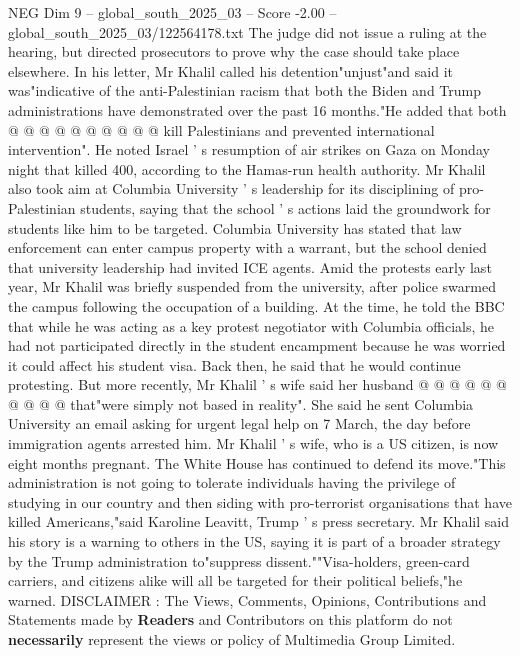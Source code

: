 \begin{textsample}{NEG Dim 9 – global\_south\_2025\_03 – Score -2.00 – global\_south\_2025\_03/122564178.txt}
The judge did not issue a ruling at the hearing, but directed prosecutors to prove why the case should take place elsewhere.
In his letter, Mr Khalil called his detention"unjust"and said it was"indicative of the anti-Palestinian racism that both the Biden and Trump administrations have demonstrated over the past 16 months."He added that both @ @ @ @ @ @ @ @ @ @ kill Palestinians and prevented international intervention".
He noted Israel ' s resumption of air strikes on Gaza on Monday night that killed 400, according to the Hamas-run health authority.
Mr Khalil also took aim at Columbia University ' s leadership for its disciplining of pro-Palestinian students, saying that the school ' s actions laid the groundwork for students like him to be targeted.
Columbia University has stated that law enforcement can enter campus property with a warrant, but the school denied that university leadership had invited ICE agents.
Amid the protests early last year, Mr Khalil was briefly suspended from the university, after police swarmed the campus following the occupation of a building.
At the time, he told the BBC that while he was acting as a key protest negotiator with Columbia officials, he had not participated directly in the student encampment because he was worried it could affect his student visa.
Back then, he said that he would continue protesting.
But more recently, Mr Khalil ' s wife said her husband @ @ @ @ @ @ @ @ @ @ that"were simply not based in reality".
She said he sent Columbia University an email asking for urgent legal help on 7 March, the day before immigration agents arrested him.
Mr Khalil ' s wife, who is a US citizen, is now eight months pregnant.
The White House has continued to defend its move."This administration is not going to tolerate individuals having the privilege of studying in our country and then siding with pro-terrorist organisations that have killed Americans,"said Karoline Leavitt, Trump ' s press secretary.
Mr Khalil said his story is a warning to others in the US, saying it is part of a broader strategy by the Trump administration to"suppress dissent.""Visa-holders, green-card carriers, and citizens alike will all be targeted for their political beliefs,"he warned.
DISCLAIMER : The Views, Comments, Opinions, Contributions and Statements made by \textbf{Readers} and Contributors on this platform do not \textbf{necessarily} represent the views or policy of Multimedia Group Limited.

\end{textsample}
